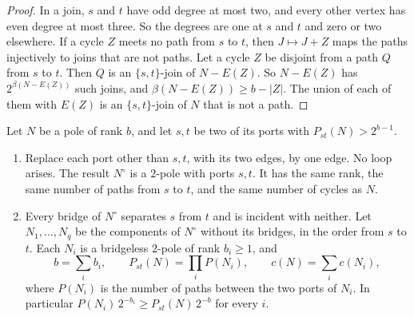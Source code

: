 \begin{proof}
In a join, $s$ and $t$ have odd degree at most two, and every other vertex has even degree at most
three. So the degrees are one at $s$ and $t$ and zero or two elsewhere. If a cycle $Z$ meets no
path from $s$ to $t$, then $J\mapsto J+Z$ maps the paths injectively to joins that are not paths.
Let a cycle $Z$ be disjoint from a path $Q$ from $s$ to $t$. Then $Q$ is an $\{s,t\}$-join of
$N-E(Z)$. So $N-E(Z)$ has $2^{\beta(N-E(Z))}$ such joins, and $\beta(N-E(Z))\ge b-|Z|$. The union
of each of them with $E(Z)$ is an $\{s,t\}$-join of $N$ that is not a path.
\end{proof}

\begin{lemma}[Reduction]\label{lem:reduction}
Let $N$ be a pole of rank $b$, and let $s,t$ be two of its ports with $P_{st}(N)>2^{b-1}$.
\begin{enumerate}
\item[\textup{(a)}] Replace each port other than $s,t$, with its two edges, by one edge. No loop
arises. The result $N^{\circ}$ is a $2$-pole with ports $s,t$. It has the same rank, the same number
of paths from $s$ to $t$, and the same number of cycles as $N$.
\item[\textup{(b)}] Every bridge of $N^{\circ}$ separates $s$ from $t$ and is incident with neither.
Let $N_1,\dots,N_q$ be the components of $N^{\circ}$ without its bridges, in the order from $s$ to
$t$. Each $N_i$ is a bridgeless $2$-pole of rank $b_i\ge1$, and
\[
  b=\sum_ib_i,\qquad P_{st}(N)=\prod_iP(N_i),\qquad c(N)=\sum_ic(N_i),
\]
where $P(N_i)$ is the number of paths between the two ports of $N_i$. In particular
$P(N_i)\,2^{-b_i}\ge P_{st}(N)\,2^{-b}$ for every $i$.
\end{enumerate}
\end{lemma}

